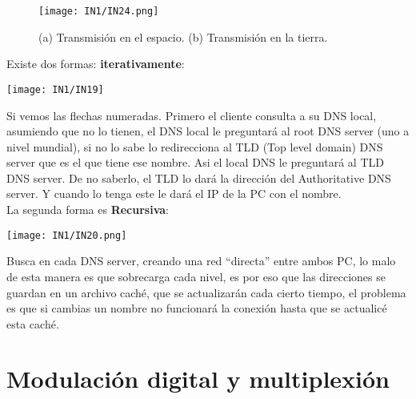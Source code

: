 \documentclass[
	12pt, %
	fleqn, %
	a4paper, %
]{LegrandOrangeBook}
\begin{document}
\begin{figure}[]
\centering
\texttt{[image: IN1/IN24.png]}
\caption{(a) Transmisión en el espacio. (b) Transmisión en la tierra.}
\label{fig: iridium-global}
\end{figure}
\begin{proposition}
Existe dos formas: \textbf{iterativamente}:
\begin{center}
\texttt{[image: IN1/IN19]}
\end{center}
Si vemos las flechas numeradas. Primero el cliente consulta a su DNS local, asumiendo que no lo tienen, el DNS local  le preguntará al root DNS server (uno a nivel mundial), si no lo sabe lo redirecciona al TLD (Top level domain) DNS server que es el que tiene ese nombre. Asi el local DNS le preguntará al TLD DNS server. De no saberlo, el TLD lo dará la dirección del Authoritative DNS server. Y cuando lo tenga este le dará el IP de la PC con el nombre.\\
La segunda forma es \textbf{Recursiva}:
\begin{center}
\texttt{[image: IN1/IN20.png]}
\end{center}
Busca en cada DNS server, creando una red ``directa'' entre ambos PC, lo malo de esta manera es que sobrecarga cada nivel, es por eso que las direcciones se guardan en un archivo caché, que se actualizarán cada cierto tiempo, el problema es que si cambias un nombre no funcionará la conexión hasta que se actualicé esta caché.
\end{proposition}
\section{Modulación digital y multiplexión}
\end{document}
